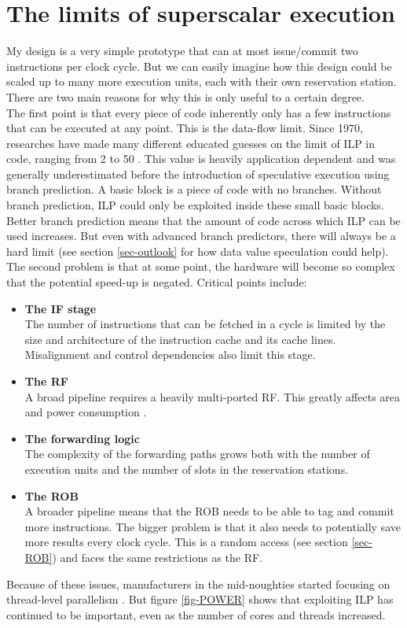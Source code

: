 \documentclass[12pt,a4paper]{article} %
\begin{document}
\section{The limits of superscalar execution} \label{sec-superscalarLimits}
My design is a very simple prototype that can at most issue/commit two instructions per clock cycle. But we can easily imagine how this design could be scaled up to many more execution units, each with their own reservation station. There are two main reasons for why this is only useful to a certain degree. \\
The first point is that every piece of code inherently only has a few instructions that can be executed at any point. This is the data-flow limit. Since 1970, researches have made many different educated guesses on the limit of ILP in code, ranging from 2 to 50 \cite[p.~24]{lipastiShen}. This value is heavily application dependent and was generally underestimated before the introduction of speculative execution using branch prediction. A basic block is a piece of code with no branches. Without branch prediction, ILP could only be exploited inside these small basic blocks. Better branch prediction means that the amount of code across which ILP can be used increases. But even with advanced branch predictors, there will always be a hard limit (see section \ref{sec-outlook} for how data value speculation could help). \\
The second problem is that at some point, the hardware will become so complex that the potential speed-up is negated. Critical points include:
\begin{itemize}
	\item \textbf{The IF stage}\\
		The number of instructions that can be fetched in a cycle is limited by the size and architecture of the instruction cache and its cache lines. Misalignment and control dependencies also limit this stage. 
	\item \textbf{The RF}\\
		A broad pipeline requires a heavily multi-ported RF. This greatly affects area and power consumption \cite[p.~4]{surveyOfRF}.
	\item \textbf{The forwarding logic}\\
		The complexity of the forwarding paths grows both with the number of execution units and the number of slots in the reservation stations.
	\item \textbf{The ROB}\\
		A broader pipeline means that the ROB needs to be able to tag and commit more instructions. The bigger problem is that it also needs to potentially save more results every clock cycle. This is a random access (see section \ref{sec-ROB}) and faces the same restrictions as the RF. 
\end{itemize}
Because of these issues, manufacturers in the mid-noughties started focusing on thread-level parallelism \cite[p.~245f]{Hennessy}. But figure \ref{fig-POWER} shows that exploiting ILP has continued to be important, even as the number of cores and threads increased.
\end{document}
